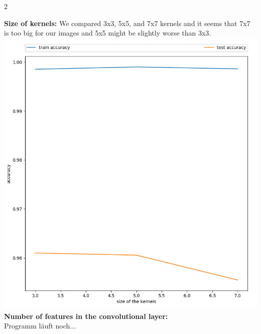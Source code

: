 \documentclass{article}
\begin{document}
\begin{ukon-infie}[3.12.17]{2}
\begin{exercise}[p=55]{}
{			
			\textbf{Size of kernels:} 
			We compared 3x3, 5x5, and 7x7 kernels and it seems that 7x7 is too big for our images and 5x5 might be slightly worse than 3x3.\\
			\includegraphics[scale=1.1]{kernelsize.png}\\
			

			\textbf{Number of features in the convolutional layer:}\\
			
			Programm läuft noch...\\
			
}
\end{exercise}
\end{ukon-infie}
\end{document}
